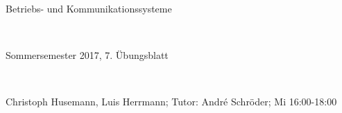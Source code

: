 \documentclass[numbers=noendperiod]{scrartcl}
\begin{document}
	
	\setlength{\parindent}{0em} 
	
	\newcommand{\inputmintedframed}[2]{
		\begin{mdframed}[linecolor=bg,backgroundcolor=bg]
			\inputminted[mathescape,breaklines,linenos,numbersep=5pt,tabsize=3]{#1}{#2}
	\end{mdframed}}
	
	\hrulefill
	\begin{center}
		\bfseries %
		\sffamily %
		\begin{huge}
			Betriebs- und Kommunikationssysteme
		\end{huge}\\
		\begin{Large}
			Sommersemester 2017, 7. Übungsblatt
		\end{Large}\\
		\begin{small}
			Christoph Husemann, Luis Herrmann; Tutor: André Schröder; Mi 16:00-18:00
		\end{small}
		
		\vspace{-10pt}
	\end{center}
	\hrulefill
	
\end{document}
